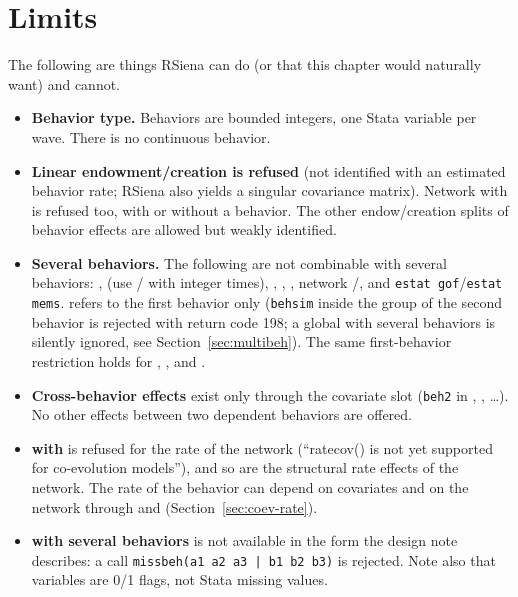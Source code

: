 \section{Limits}\label{sec:coev-limits}

The following are things RSiena can do (or that this chapter would naturally want) and \nwsaom{} cannot.

\begin{itemize}
\item \textbf{Behavior type.} Behaviors are bounded integers, one Stata variable per wave. There is no continuous behavior.
\item \textbf{Linear endowment/creation is refused} (not identified with an estimated behavior rate; RSiena also yields a singular covariance matrix). Network  with  is refused too, with or without a behavior. The other endow/creation splits of behavior effects are allowed but weakly identified.
\item \textbf{Several behaviors.} The following are not combinable with several behaviors: ,  (use / with integer times), , , , network /, and \texttt{estat gof}/\texttt{estat mems}.  refers to the first behavior only (\texttt{behsim} inside the group of the second behavior is rejected with return code 198; a global  with several behaviors is silently ignored, see Section~\ref{sec:multibeh}). The same first-behavior restriction holds for , ,  and .
\item \textbf{Cross-behavior effects} exist only through the covariate slot (\texttt{beh2} in , ,  \dots). No other effects between two dependent behaviors are offered.
\item \textbf{ with } is refused for the rate of the network (``ratecov() is not yet supported for co-evolution models''), and so are the structural rate effects of the network. The rate of the behavior can depend on covariates and on the network through  and  (Section~\ref{sec:coev-rate}).
\item \textbf{ with several behaviors} is not available in the form the design note describes: a call \texttt{missbeh(a1 a2 a3 | b1 b2 b3)} is rejected. Note also that  variables are 0/1 flags, not Stata missing values.

\end{itemize}
